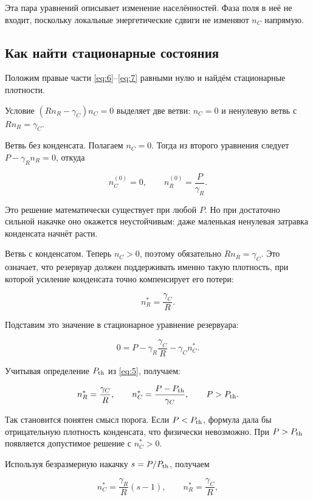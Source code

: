 \documentclass[12pt,a4paper]{article}
\begin{document}
Эта пара уравнений описывает изменение населённостей. Фаза поля в неё не входит, поскольку локальные энергетические сдвиги не изменяют $n_{C}$ напрямую.

\subsection{Как найти стационарные состояния}\label{sec:3.2}

Положим правые части \eqref{eq:6}--\eqref{eq:7} равными нулю и найдём стационарные плотности.

Условие $(R n_{R}-\gamma_{C})n_{C}=0$ выделяет две ветви: $n_{C}=0$ и ненулевую ветвь с $R n_{R}=\gamma_{C}$.

Ветвь без конденсата. Полагаем $n_{C}=0$. Тогда из второго уравнения следует $P-\gamma_{R} n_{R}=0$, откуда

\begin{equation}\label{eq:8}
n_C^{(0)}=0,\qquad n_R^{(0)}=\frac{P}{\gamma_R}.\end{equation}

Это решение математически существует при любой $P$. Но при достаточно сильной накачке оно окажется неустойчивым: даже маленькая ненулевая затравка конденсата начнёт расти.

Ветвь с конденсатом. Теперь $n_{C}>0$, поэтому обязательно $R n_{R}=\gamma_{C}$. Это означает, что резервуар должен поддерживать именно такую плотность, при которой усиление конденсата точно компенсирует его потери:

\[
n_R^*=\frac{\gamma_C}{R}.
\]

Подставим это значение в стационарное уравнение резервуара:

\[
0=P-\gamma_R\frac{\gamma_C}{R}-\gamma_C n_C^*.
\]

Учитывая определение $P_{\rm th}$ из \eqref{eq:5}, получаем:

\begin{equation}\label{eq:9}
n_R^*=\frac{\gamma_C}{R},\qquad n_C^*=\frac{P-P_{\rm th}}{\gamma_C},\qquad P>P_{\rm th}.\end{equation}

Так становится понятен смысл порога. Если $P<P_{\rm th}$, формула дала бы отрицательную плотность конденсата, что физически невозможно. При $P>P_{\rm th}$ появляется допустимое решение с $n_{C}^{*}>0$.

Используя безразмерную накачку $s=P/P_{\rm th}$, получаем

\begin{equation}\label{eq:10}
n_C^*=\frac{\gamma_R}{R}(s-1),\qquad n_R^*=\frac{\gamma_C}{R},\end{equation}
\end{document}
